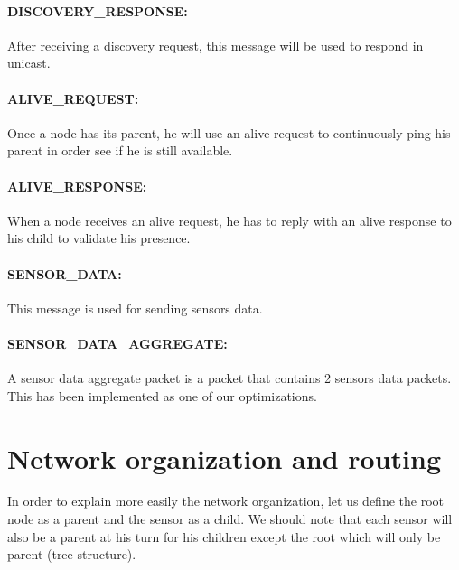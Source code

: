 \documentclass[a4paper,10pt]{article}
\begin{document}
\paragraph{DISCOVERY\_RESPONSE:} After receiving a discovery request, this message will be used to respond in unicast. 

\paragraph{ALIVE\_REQUEST:} Once a node has its parent, he will use an alive request to continuously ping his parent in order see if he is still available.

\paragraph{ALIVE\_RESPONSE:} When a node receives an alive request, he has to reply with an alive response to his child to validate his presence. 

\paragraph{SENSOR\_DATA:} This message is used for sending sensors data. 

\paragraph{SENSOR\_DATA\_AGGREGATE:} A sensor data aggregate packet is a packet that contains 2 sensors data packets. This has been implemented as one of our optimizations.

\section{Network organization and routing}
\label{routing}
In order to explain more easily the network organization, let us define the root node as a parent and the sensor as a child. We should note that each sensor will also be a parent at his turn for his children except the root which will only be parent (tree structure).
\end{document}

